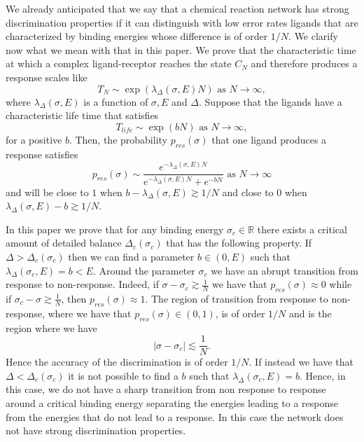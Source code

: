 \documentclass{article}
\numberwithin{equation}{section}
\theoremstyle{plain}
\begin{document}
We already anticipated that we say that a chemical reaction network has strong discrimination properties if it can distinguish with low error rates ligands that are characterized by binding energies whose difference is of order $1/N $. 
We clarify now what we mean with that in this paper. 
 We prove that the characteristic time at which a complex ligand-receptor reaches the state $C_{N}$ and therefore produces a response scales like 
 \[
 T_N \sim \exp\left( \lambda_\Delta  (\sigma, E) N \right) \text{ as } N \to \infty, 
 \]
 where $\lambda_\Delta (\sigma, E) $ is a function of $\sigma, E $ and $\Delta $. 
Suppose that the ligands have a characteristic life time that satisfies 
\begin{equation}\label{tlife}
 T_{life} \sim \exp\left( b N \right)  \text{ as } N \to \infty, 
\end{equation}
for a positive $b$. 
Then, the probability $p_{res}(\sigma)$  that one ligand produces a response satisfies
\[
p_{res} (\sigma) \sim \frac{e^{-\lambda_\Delta (\sigma, E) N}}{e^{-\lambda_\Delta (\sigma, E) N } + e^{-b N  }} \text{ as } N \to \infty 
\] 
 and will be close to $1 $ when $ b - \lambda_\Delta (\sigma, E)  \gtrsim 1/N $ and close to $0$ when  $  \lambda_\Delta (\sigma, E) - b  \gtrsim 1/N $.


In this paper we prove that for any binding energy $\sigma_c \in \mathbb R$ there exists a critical amount of detailed balance $\Delta_c(\sigma_c) $ that has the following property. If $\Delta > \Delta_c(\sigma_c) $ then we can find a parameter $b \in (0, E) $ such that $
\lambda_\Delta (\sigma_c, E) =b< E. $
Around the parameter $\sigma_c$ we have an abrupt transition from response to non-response. 
Indeed, if $\sigma - \sigma_c \gtrsim \frac{1}{N} $ we have that $p_{res} (\sigma) \approx 0 $ while if $ \sigma_c -  \sigma  \gtrsim \frac{1}{N} $, then  $p_{res} ( \sigma) \approx 1 $.  
The region of transition from response to non-response, where we have that $p_{res} ( \sigma ) \in (0,1) $, is of order $1/N$ and is the region where we have 
\[
| \sigma - \sigma_c | \lesssim \frac{1}{N} . 
\] 
 Hence the accuracy of the discrimination is of order $1/N$.
 If instead we have that $\Delta < \Delta_c (\sigma_c) $ it is not possible to find a $b $ such that $\lambda_\Delta(\sigma_c , E) = b $. 
 Hence, in this case, we do not have a sharp transition from non response to response around a critical binding energy separating the energies leading to a response from the energies that do not lead to a response. In this case the network does not have strong discrimination properties. 
  
\end{document}
